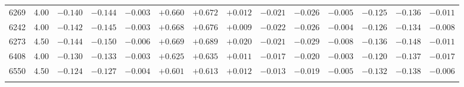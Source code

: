 \documentclass[]{aa}
\begin{document}
\begin{appendix}
\begin{table*}
\begin{center}
\begin{tabular}{llllllllllllll}
6269  &4.00 & $-0.140$ &$ -0.144$ &$ -0.003$ &$ +0.660$ &$ +0.672$ &$ +0.012$ &$ -0.021$ &$ -0.026$ &$ -0.005$ &$ -0.125$& $-0.136$& $-0.011 $\\
6242  &4.00 & $-0.142$ &$ -0.145$ &$ -0.003$ &$ +0.668$ &$ +0.676$ &$ +0.009$ &$ -0.022$ &$ -0.026$ &$ -0.004$ &$ -0.126$& $-0.134$& $-0.008 $\\
6273  &4.50 & $-0.144$ &$ -0.150$ &$ -0.006$ &$ +0.669$ &$ +0.689$ &$ +0.020$ &$ -0.021$ &$ -0.029$ &$ -0.008$ &$ -0.136$& $-0.148$& $-0.011 $\\
6408  &4.00 & $-0.130$ &$ -0.133$ &$ -0.003$ &$ +0.625$ &$ +0.635$ &$ +0.011$ &$ -0.017$ &$ -0.020$ &$ -0.003$ &$ -0.120$& $-0.137$& $-0.017 $\\
6550  &4.50 & $-0.124$ &$ -0.127$ &$ -0.004$ &$ +0.601$ &$ +0.613$ &$ +0.012$ &$ -0.013$ &$ -0.019$ &$ -0.005$ &$ -0.132$& $-0.138$& $-0.006 $\\
\hline\noalign{\smallskip}
\hline\noalign{\smallskip}
\end{tabular}
\end{center}
\end{table*}

\clearpage


\end{appendix}
\end{document}
